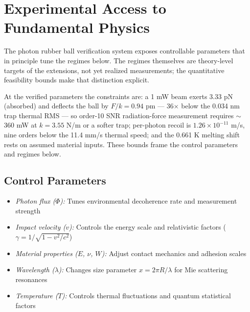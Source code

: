 \documentclass[12pt,twoside]{article}
\begin{document}
\section{Experimental Access to Fundamental Physics}\label{sec:experimental}
The photon rubber ball verification system exposes controllable parameters that in principle tune the regimes below. The regimes themselves are theory-level targets of the extensions, not yet realized measurements; the quantitative feasibility bounds make that distinction explicit.

At the verified parameters the constraints are: a 1 mW beam exerts 3.33 pN (absorbed) and deflects the ball by $F/k = 0.94$ pm — 36$\times$ below the 0.034 nm trap thermal RMS — so order-10 SNR radiation-force measurement requires $\sim$360 mW at $k = 3.55$ N/m or a softer trap; per-photon recoil is $1.26\times10^{-11}$ m/s, nine orders below the 11.4 mm/s thermal speed; and the 0.661 K melting shift rests on assumed material inputs. These bounds frame the control parameters and regimes below.

\subsection{Control Parameters}\label{sec:control}
\begin{itemize}
\item \textit{Photon flux ($\Phi$):} Tunes environmental decoherence rate and measurement strength
\item \textit{Impact velocity ($v$):} Controls the energy scale and relativistic factors ($\gamma = 1/\sqrt{1-v^2/c^2}$)
\item \textit{Material properties ($E$, $\nu$, $W$):} Adjust contact mechanics and adhesion scales
\item \textit{Wavelength ($\lambda$):} Changes size parameter $x = 2\pi R/\lambda$ for Mie scattering resonances
\item \textit{Temperature ($T$):} Controls thermal fluctuations and quantum statistical factors
\end{itemize}
\end{document}
